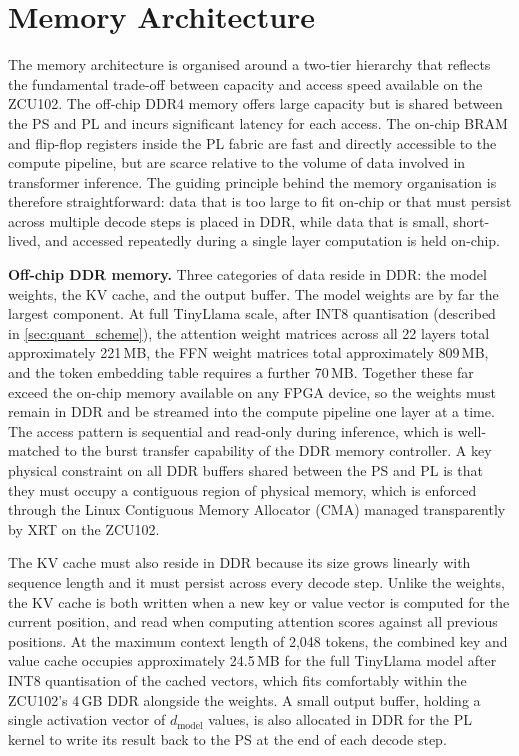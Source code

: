 \section{Memory Architecture}
\label{sec:memory_arch}

The memory architecture is organised around a two-tier hierarchy that reflects
the fundamental trade-off between capacity and access speed available on the
ZCU102. The off-chip DDR4 memory offers large capacity but is shared between
the PS and PL and incurs significant latency for each access. The on-chip
BRAM and flip-flop registers inside the PL fabric are fast and directly
accessible to the compute pipeline, but are scarce relative to the volume of
data involved in transformer inference. The guiding principle behind the
memory organisation is therefore straightforward: data that is too large to
fit on-chip or that must persist across multiple decode steps is placed in
DDR, while data that is small, short-lived, and accessed repeatedly during
a single layer computation is held on-chip.

\noindent\textbf{Off-chip DDR memory.} Three categories of data reside in
DDR: the model weights, the KV cache, and the output buffer. The model weights
are by far the largest component. At full TinyLlama scale, after INT8 quantisation (described in
\cref{sec:quant_scheme}), the attention weight matrices across all 22 layers
total approximately 221\,MB, the FFN weight matrices total approximately
809\,MB, and the token embedding table requires a further 70\,MB. Together
these far exceed the on-chip memory available on any FPGA device, so the
weights must remain in DDR and be streamed into the compute pipeline one
layer at a time. The access pattern
is sequential and read-only during inference, which is well-matched to the
burst transfer capability of the DDR memory controller. A key physical constraint on all DDR buffers shared between the PS and PL is that they must occupy a contiguous region of physical memory, which is enforced through the Linux Contiguous Memory Allocator (CMA) managed transparently by XRT on the ZCU102.

The KV cache must also reside in DDR because its size grows linearly with
sequence length and it must persist across every decode step. Unlike the
weights, the KV cache is both written when a new key or value vector is
computed for the current position, and read when computing attention scores
against all previous positions. At the maximum context length of 2{,}048 tokens, the combined key and
value cache occupies approximately 24.5\,MB for the full TinyLlama model
after INT8 quantisation of the cached vectors, which fits comfortably
within the ZCU102's 4\,GB DDR alongside the weights. A small output buffer, holding a single
activation vector of $d_{\text{model}}$ values, is also allocated in DDR
for the PL kernel to write its result back to the PS at the end of each
decode step.

